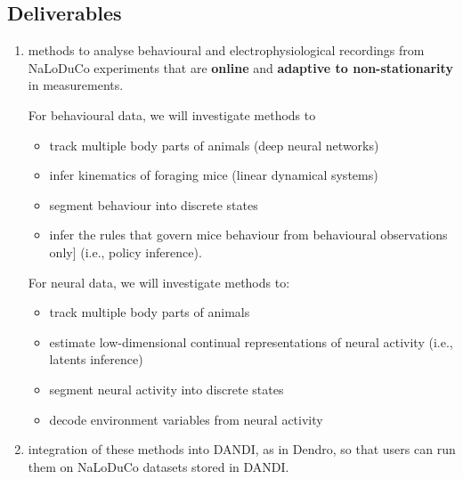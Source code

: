 
\subsection{Deliverables}

\begin{enumerate}

    \item methods to analyse behavioural and electrophysiological recordings
    from NaLoDuCo experiments that are \textbf{online} and \textbf{adaptive to
    non-stationarity} in measurements.

    For behavioural data, we will investigate methods to

    \begin{itemize}

        \item track multiple body parts of animals (deep neural networks)

        \item infer kinematics of foraging mice (linear dynamical systems)

        \item segment behaviour into discrete states

        \item infer the rules that govern mice behaviour from behavioural
        observations only] (i.e., policy inference).

    \end{itemize}

    For neural data, we will investigate methods to:
    \begin{itemize}

        \item track multiple body parts of animals

        \item estimate low-dimensional continual representations of neural
        activity (i.e., latents inference) 

        \item segment neural activity into discrete states

        \item decode environment variables from neural activity

    \end{itemize}

    \item integration of these methods into DANDI, as in Dendro, so that users
    can run them on NaLoDuCo datasets stored in DANDI.

\end{enumerate}

